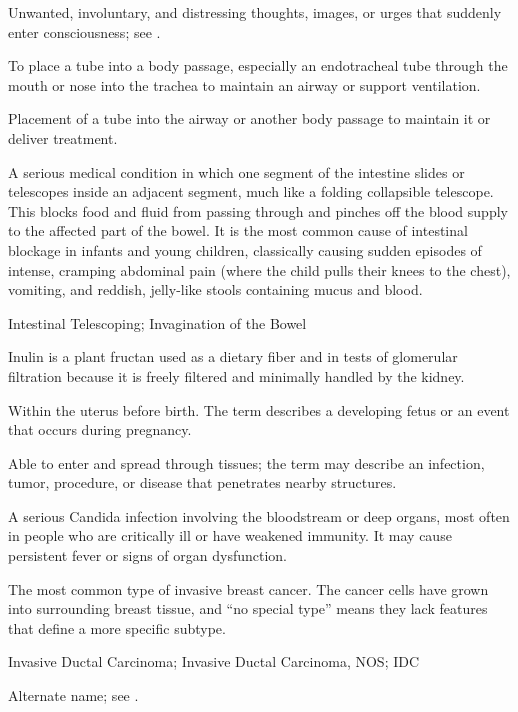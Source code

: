  Unwanted, involuntary, and distressing thoughts, images, or urges that suddenly enter consciousness; see .

 To place a tube into a body passage, especially an endotracheal tube through the mouth or nose into the trachea to maintain an airway or support ventilation.

 Placement of a tube into the airway or another body passage to maintain it or deliver treatment.

 A serious medical condition in which one segment of the intestine slides or telescopes inside an adjacent segment, much like a folding collapsible telescope. This blocks food and fluid from passing through and pinches off the blood supply to the affected part of the bowel. It is the most common cause of intestinal blockage in infants and young children, classically causing sudden episodes of intense, cramping abdominal pain (where the child pulls their knees to the chest), vomiting, and reddish, jelly-like stools containing mucus and blood.

\synonyms
Intestinal Telescoping; Invagination of the Bowel

 Inulin is a plant fructan used as a dietary fiber and in tests of glomerular filtration because it is freely filtered and minimally handled by the kidney.

 Within the uterus before birth. The term describes a developing fetus or an event that occurs during pregnancy.

 Able to enter and spread through tissues; the term may describe an infection, tumor, procedure, or disease that penetrates nearby structures.

 A serious Candida infection involving the bloodstream or deep organs, most often in people who are critically ill or have weakened immunity. It may cause persistent fever or signs of organ dysfunction.

 The most common type of invasive breast cancer. The cancer cells have grown into surrounding breast tissue, and “no special type” means they lack features that define a more specific subtype.

\synonyms
Invasive Ductal Carcinoma; Invasive Ductal Carcinoma, NOS; IDC

 Alternate name; see .

